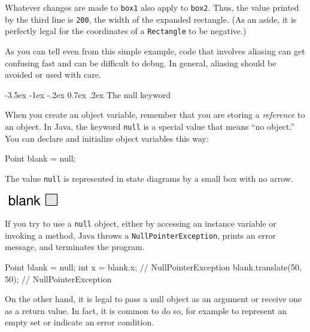 \documentclass[12pt]{book}
\makeatletter
\theoremstyle{exercise}
\newcommand{\java}[1]{\verb"#1"}
\renewcommand{\section}{\@startsection {section}{1}{\z@}%
    {-3.5ex \@plus -1ex \@minus -.2ex}%
    {0.7ex \@plus.2ex}%
    {\normalfont\Large\bfseries}}
\newcommand{\java}[1]{\lstinline{#1}} %
\makeatother
\begin{document}
Whatever changes are made to \java{box1} also apply to \java{box2}.
Thus, the value printed by the third line is {\tt 200}, the width of the expanded rectangle.
(As an aside, it is perfectly legal for the coordinates of a \java{Rectangle} to be negative.)

As you can tell even from this simple example, code that involves aliasing can get confusing fast and can be difficult to debug.
In general, aliasing should be avoided or used with care.


\section{The null keyword}


When you create an object variable, remember that you are storing a {\em reference} to an object.
In Java, the keyword \java{null} is a special value that means ``no object.''
You can declare and initialize object variables this way:

\begin{code}
    Point blank = null;
\end{code}

The value \java{null} is represented in state diagrams by a small box with no arrow.

\begin{center}
\includegraphics{figs/reference2.pdf}
\end{center}


If you try to use a \java{null} object, either by accessing an instance variable or invoking a method, Java throws a \java{NullPointerException}, prints an error message, and terminates the program.

\begin{code}
    Point blank = null;
    int x = blank.x;              // NullPointerException
    blank.translate(50, 50);      // NullPointerException
\end{code}

On the other hand, it is legal to pass a null object as an argument or receive one as a return value.
In fact, it is common to do so, for example to represent an empty set or indicate an error condition.
\end{document}
